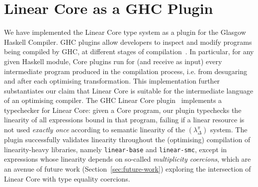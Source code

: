 \documentclass[acmsmall,review,anonymous]{acmart}
\newcommand{\notyetcolorname}{light yellow}
\newcommand{\lolli}{\multimap}
\newcommand{\ccase}[2]{\mathsf{case}~#1~\mathsf{of}~#2}
\begin{document}



\section{Linear Core as a GHC Plugin\label{sec:discuss:implementation}}

We have implemented the Linear Core type system as a plugin for the Glasgow
Haskell Compiler.
GHC plugins allow developers to inspect and modify programs being compiled by
GHC, at different stages of compilation~\cite{10.1145/3331545.3342599}.
%
In particular, for any given Haskell module, Core plugins run for (and receive
as input) every intermediate program produced in the compilation process, i.e.
from desugaring and after each optimising transformation.
%
This implementation further substantiates our claim that Linear Core is
suitable for the intermediate language of an optimising compiler.
The GHC Linear Core plugin~\cite{cite:linear-core-plugin} implements a
typechecker for Linear Core: given a Core program, our plugin typechecks the
linearity of all expressions bound in that program, failing if a linear
resource is not used \emph{exactly once} according to semantic linearity of the
$(\lambda^\pi_\Delta)$ system.
%
The plugin successfully validates linearity throughout the
(optimising) compilation of linearity-heavy libraries, namely
\texttt{linear-base} and \texttt{linear-smc}, except in expressions whose
linearity depends on so-called \emph{multiplicity coercions}, which are an
avenue of future work (Section~\ref{sec:future-work}) exploring the intersection
of Linear Core with type equality coercions.
\end{document}
